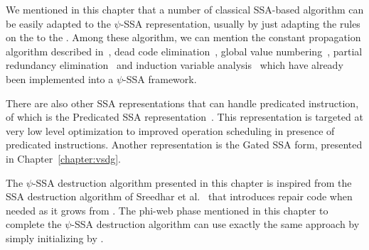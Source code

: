 We mentioned in this chapter that a number of classical SSA-based algorithm can be easily adapted to the $\psi$-SSA representation, usually by just adapting the rules on the \phifuns to the \psifuns. Among these algorithm, we can mention the constant propagation algorithm described in~\cite{WZ91}, dead code elimination~\cite{morgan98}, global value numbering~\cite{Cli95}, partial redundancy elimination~\cite{CCK+97} and induction variable analysis~\cite{Wolfe92} which have already been implemented into a $\psi$-SSA framework.

There are also other SSA representations that can handle predicated instruction, of which is the Predicated SSA representation~\cite{Carter:PACT99}. This representation is targeted at very low level optimization to improved operation scheduling in presence of predicated instructions. Another representation is the Gated SSA form, presented in Chapter~\ref{chapter:vsdg}.

The $\psi$-SSA destruction algorithm presented in this chapter is inspired from the SSA destruction algorithm of Sreedhar et al.~\cite{SreedharSep99} that introduces repair code when needed as it grows \phiwebs from \phifuns. The phi-web phase mentioned in this chapter to complete the $\psi$-SSA destruction algorithm can use exactly the same approach by simply initializing \phipsiwebs by \psiwebs.
